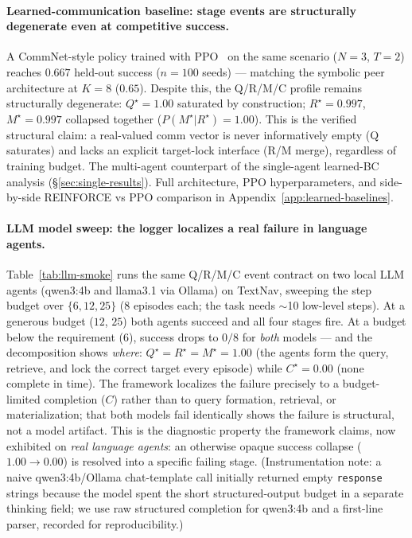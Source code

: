 \documentclass{article}
\begin{document}
\paragraph{Learned-communication baseline: stage events are structurally degenerate even at competitive success.}
A CommNet-style policy \citep{sukhbaatar2016commnet} trained with PPO~\citep{schulman2017proximal} on the same scenario ($N{=}3$, $T{=}2$) reaches $0.667$ held-out success ($n{=}100$ seeds) --- matching the symbolic peer architecture at $K{=}8$ ($0.65$). Despite this, the Q/R/M/C profile remains structurally degenerate: $Q^\star{=}1.00$ saturated by construction; $R^\star{=}0.997$, $M^\star{=}0.997$ collapsed together ($P(M^\star|R^\star){=}1.00$). This is the verified structural claim: a real-valued comm vector is never informatively empty (Q saturates) and lacks an explicit target-lock interface (R/M merge), regardless of training budget. The multi-agent counterpart of the single-agent learned-BC analysis (\S\ref{sec:single-results}). Full architecture, PPO hyperparameters, and side-by-side REINFORCE vs PPO comparison in Appendix~\ref{app:learned-baselines}.

\paragraph{LLM model sweep: the logger localizes a real failure in language agents.}
Table~\ref{tab:llm-smoke} runs the same Q/R/M/C event contract on two local LLM agents (qwen3:4b and llama3.1 via Ollama) on TextNav, sweeping the step budget over $\{6,12,25\}$ ($8$ episodes each; the task needs $\sim$10 low-level steps). At a generous budget ($12$, $25$) both agents succeed and all four stages fire. At a budget below the requirement ($6$), success drops to $0/8$ for \emph{both} models --- and the decomposition shows \emph{where}: $Q^\star{=}R^\star{=}M^\star{=}1.00$ (the agents form the query, retrieve, and lock the correct target every episode) while $C^\star{=}0.00$ (none complete in time). The framework localizes the failure precisely to a budget-limited completion ($C$) rather than to query formation, retrieval, or materialization; that both models fail identically shows the failure is structural, not a model artifact. This is the diagnostic property the framework claims, now exhibited on \emph{real language agents}: an otherwise opaque success collapse ($1.00\to0.00$) is resolved into a specific failing stage. (Instrumentation note: a naive qwen3:4b/Ollama chat-template call initially returned empty \texttt{response} strings because the model spent the short structured-output budget in a separate thinking field; we use raw structured completion for qwen3:4b and a first-line parser, recorded for reproducibility.)
\end{document}

